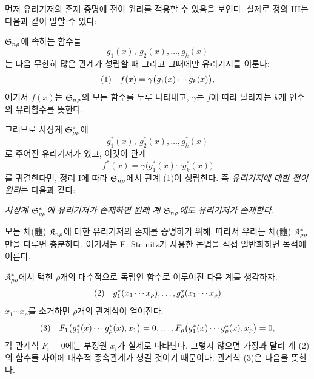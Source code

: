 먼저 유리기저의 존재 증명에 전이 원리를 적용할 수 있음을 보인다. 실제로 정의 III는 다음과 같이 말할 수 있다:

$\mathfrak S_{n\rho}$에 속하는 함수들
\[
g_1(x),\ g_2(x),\ldots,g_k(x)
\]
는 다음 무한히 많은 관계가 성립할 때 그리고 그때에만 유리기저를 이룬다:
\[
\begin{array}{@{}l@{\quad}c@{}}
(1)& f(x)=\gamma\bigl(g_1(x)\cdots g_k(x)\bigr),
\end{array}
\]
여기서 $f(x)$는 $\mathfrak S_{n\rho}$의 모든 함수를 두루 나타내고, $\gamma$는 $f$에 따라 달라지는 $k$개 인수의 유리함수를 뜻한다.

그러므로 사상계 $\mathfrak S^*_{\rho\rho}$에
\[
g_1^*(x),\ g_2^*(x),\ldots,g_k^*(x)
\]
로 주어진 유리기저가 있고, 이것이 관계
\[
f^*(x)=\gamma\bigl(g_1^*(x)\cdots g_k^*(x)\bigr)
\]
를 귀결한다면, 정리 I에 따라 $\mathfrak S_{n\rho}$에서 관계 (1)이 성립한다. 즉 \emph{유리기저에 대한 전이 원리}는 다음과 같다:

\emph{사상계 $\mathfrak S^*_{\rho\rho}$에 유리기저가 존재하면 원래 계 $\mathfrak S_{n\rho}$에도 유리기저가 존재한다.}

모든 체(體) $\mathfrak K_{n\rho}$에 대한 유리기저의 존재를 증명하기 위해, 따라서 우리는 체(體) $\mathfrak K^*_{\rho\rho}$만을 다루면 충분하다. 여기서는 E. Steinitz가 사용한 논법을 직접 일반화하면 목적에 이른다.

$\mathfrak K^*_{\rho\rho}$에서 택한 $\rho$개의 대수적으로 독립인 함수로 이루어진 다음 계를 생각하자.
\[
\begin{array}{@{}l@{\quad}c@{}}
(2)& g_1^*(x_1\cdots x_\rho),\ldots,g_\rho^*(x_1\cdots x_\rho)
\end{array}
\]
$x_1\cdots x_\rho$를 소거하면 $\rho$개의 관계식이 얻어진다.
\[
\begin{array}{@{}l@{\quad}c@{}}
(3)& F_1\bigl(g_1^*(x)\cdots g_\rho^*(x),x_1\bigr)=0,\ldots,
F_\rho\bigl(g_1^*(x)\cdots g_\rho^*(x),x_\rho\bigr)=0,
\end{array}
\]
각 관계식 $F_i=0$에는 부정원 $x_i$가 실제로 나타난다. 그렇지 않으면 가정과 달리 계 (2)의 함수들 사이에 대수적 종속관계가 생길 것이기 때문이다. 관계식 (3)은 다음을 뜻한다.

